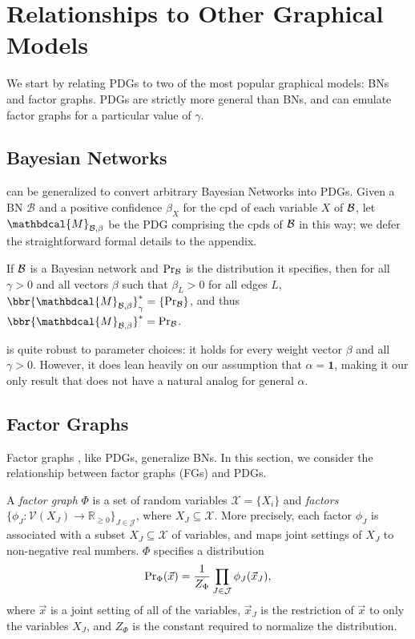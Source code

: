 \documentclass[letterpaper]{article} %
\theoremstyle{plain}
\theoremstyle{definition}
\theoremstyle{remark}
\newcommand{\begthm}[3][]{\begin{#2}[{name=#1},restate=#3,label=#3]}
\newcommand{\V}{\mathcal V}
\newcommand{\dg}[1]{\mathbdcal{#1}}
\newcommand{\PDGof}[1]{{\dg M}_{#1}}
\begin{document}
\section{Relationships to Other Graphical Models}
\label{sec:other-graphical-models} 
We start by relating
PDGs to two of the most popular graphical models: BNs and factor
graphs. PDGs are strictly more general than BNs, and can emulate factor graphs
for a particular value of $\gamma$. 
\subsection{Bayesian Networks} 
\label{sec:bn-convert}

 can be generalized to convert arbitrary Bayesian Networks into PDGs.
Given a BN $\mathcal B$ and a positive confidence $\beta_X$ for
the cpd of each variable $X$ of $\cal B$,
let $\PDGof{\mathcal B, \beta}$
be the PDG comprising the cpds of $\cal B$
in this way; we defer the straightforward formal details to the appendix. 

	
\begthm{theorem}{thm:bns-are-pdgs}
 	  If $\cal B$ is a Bayesian network
          and $\Pr_{\cal B}$ is the distribution it specifies, then
        for all $\gamma > 0$ and all vectors $\beta$ such
        that $\beta_L > 0$ for all edges $L$,
        $\bbr{\PDGof{\mathcal B, \beta}}_\gamma^* = \{ \Pr_{\cal B}\}$, 
and thus $\bbr{\PDGof{\mathcal B, \beta}}^* = \Pr_{\cal B}$.    
\end{theorem}
 is quite robust to parameter choices: it holds for every
weight vector $\beta$ and all $\gamma > 0$. However, it does lean heavily on
our assumption that $\alpha = \mathbf 1$, making it our only result
that does not 
have a natural analog for general $\alpha$.



\subsection{Factor Graphs} 
\label{sec:factor-graphs}
Factor graphs 
\cite{kschischang2001sumproduct},
like PDGs, generalize BNs.
In this section, we consider the relationship between factor graphs (FGs) and PDGs.
\begin{defn}
 A \emph{factor graph} $\Phi$ is a set of random variables
        $\mathcal X = \{X_i\}$ and \emph{factors}
       $\{\phi_J\colon \V(X_J) \to \mathbb R_{\geq0}\}_{J \in
\mathcal J }$,
where $X_J \subseteq \mathcal X$.  
More precisely, each factor $\phi_J$ is associated with a subset
$X_J\subseteq \mathcal{X}$ of variables, and maps
joint settings of $X_J$ to non-negative real numbers.
$\Phi$ specifies a distribution
\[ {\Pr}_{\Phi}(\vec x) = \frac{1}{Z_{\Phi}}
 	\prod_{J \in \cal J} \phi_J(\vec x_J), \]
where $\vec{x}$ is a joint setting of all of the variables,
 $\vec{x}_J$ is the restriction of $\vec{x}$ to only the
 variables $X_J$, and $Z_{\Phi}$ is the constant required to
 normalize the distribution.  
\end{defn}
\end{document}
